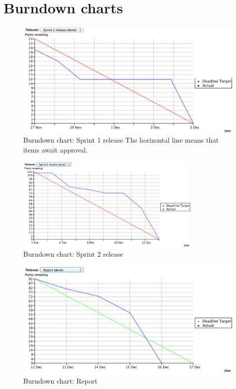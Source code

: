 \section{Burndown charts}
\label{sec:burndown-charts}

\begin{figure}[htb]
	\centering
	\includegraphics[width=1\textwidth]{Appendices/graphics/burndown_1.png}
	\caption{Burndown chart: Sprint 1 release \newline The horizontal line means that items await approval.}
	\label{fig:burndown-chart-1}
\end{figure}

\begin{figure}[htb]
	\centering
	\includegraphics[width=0.8\textwidth]{Appendices/graphics/burndown_2.png}
	\caption{Burndown chart: Sprint 2 release}
	\label{fig:burndown-chart-2}
\end{figure}

\begin{figure}[htb]
	\centering
	\includegraphics[width=1\textwidth]{Appendices/graphics/burndown_3.png}
	\caption{Burndown chart: Report}
	\label{fig:burndown-chart-3}
\end{figure}
